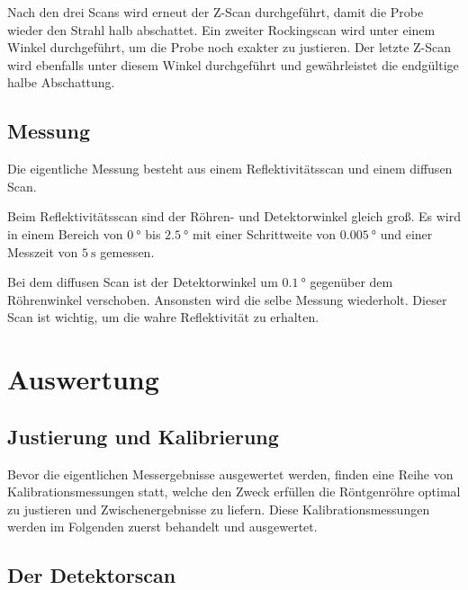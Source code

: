 Nach den drei Scans wird erneut der Z-Scan durchgeführt, damit die Probe wieder den Strahl halb abschattet.
Ein zweiter Rockingscan wird unter einem Winkel durchgeführt, um die Probe noch exakter zu justieren.
Der letzte Z-Scan wird ebenfalls unter diesem Winkel durchgeführt und gewährleistet die endgültige halbe Abschattung. %



\subsection{Messung}
Die eigentliche Messung besteht aus einem Reflektivitätsscan und einem diffusen Scan.

Beim Reflektivitätsscan sind der Röhren- und Detektorwinkel gleich groß. Es wird in einem Bereich von $\SI{0}{\degree}$ bis $\SI{2.5}{\degree}$ mit einer Schrittweite von $\SI{0.005}{\degree}$ und einer Messzeit von $\SI{5}{\second}$ gemessen.

Bei dem diffusen Scan ist der Detektorwinkel um $\SI{0.1}{\degree}$ gegenüber dem Röhrenwinkel verschoben. Ansonsten wird die selbe Messung wiederholt. Dieser Scan ist wichtig, um die wahre Reflektivität zu erhalten. %

\newpage
\section{Auswertung}
\subsection{Justierung und Kalibrierung}
Bevor die eigentlichen Messergebnisse ausgewertet werden, finden eine Reihe von Kalibrationsmessungen statt,
welche den Zweck erfüllen die Röntgenröhre optimal zu justieren und Zwischenergebnisse zu liefern.
Diese Kalibrationsmessungen werden im Folgenden zuerst behandelt und ausgewertet.

\subsection*{Der Detektorscan}

